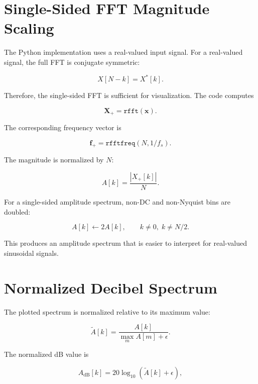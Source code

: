 ﻿\documentclass[11pt]{article}
\begin{document}
\section{Single-Sided FFT Magnitude Scaling}

The Python implementation uses a real-valued input signal. For a real-valued signal, the full FFT is conjugate symmetric:

\begin{equation}
X[N-k] = X^{*}[k].
\end{equation}

Therefore, the single-sided FFT is sufficient for visualization. The code computes

\begin{equation}
\bm{X}_{+} = \texttt{rfft}(\bm{x}).
\end{equation}

The corresponding frequency vector is

\begin{equation}
\bm{f}_{+} = \texttt{rfftfreq}(N,1/f_s).
\end{equation}

The magnitude is normalized by $N$:

\begin{equation}
A[k] = \frac{|X_{+}[k]|}{N}.
\end{equation}

For a single-sided amplitude spectrum, non-DC and non-Nyquist bins are doubled:

\begin{equation}
A[k] \leftarrow 2A[k],
\qquad
k \neq 0,\; k \neq N/2.
\end{equation}

This produces an amplitude spectrum that is easier to interpret for real-valued sinusoidal signals.

\section{Normalized Decibel Spectrum}

The plotted spectrum is normalized relative to its maximum value:

\begin{equation}
\tilde{A}[k]
=
\frac{A[k]}{\max_{m} A[m] + \epsilon}.
\end{equation}

The normalized dB value is

\begin{equation}
A_{\text{dB}}[k]
=
20\log_{10}\left(\tilde{A}[k] + \epsilon\right),
\end{equation}
\end{document}
